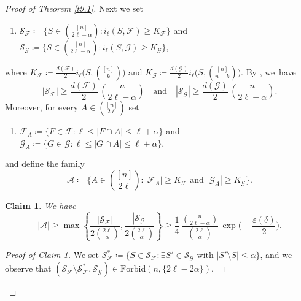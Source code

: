 \documentclass[10pt,a4paper]{amsart}
\newtheorem{claim}[thm]{Claim}
\theoremstyle{remark}
\newcommand{\ee}{\varepsilon}
\newcommand{\meg}{\geqslant}
\newcommand{\mik}{\leqslant}
\newcommand{\Fcal}{\mathcal{F}}
\newcommand{\Gcal}{\mathcal{G}}
\newcommand{\Scal}{\mathcal{S}}
\newcommand{\Acal}{\mathcal{A}}
\begin{document}
\begin{proof}[Proof of Theorem \emph{\ref{t9.1}}]
Next we set
\begin{enumerate}
\item[$\bullet$] $\Scal_{\Fcal} \coloneqq \big\{ S\in\binom{[n]}{2\ell-\alpha}:
i_{\ell}(S,\Fcal)\meg K_{\Fcal}\big\}$ and
$\Scal_{\Gcal}\coloneqq \big\{ S\in\binom{[n]}{2\ell-\alpha}:
i_{\ell}(S,\Gcal)\meg K_{\Gcal}\big\}$,
\end{enumerate}
where $K_{\Fcal}\coloneqq \frac{d(\Fcal)}{2} i_{\ell}\big(S,\binom{[n]}{k}\big)$ and
$K_{\Gcal}\coloneqq \frac{d(\Gcal)}{2}i_{\ell}\big(S,\binom{[n]}{n-k}\big)$.
By \cite[Lemma 4.1]{FR87}, we~have
\begin{equation} \label{e9.7}
|\Scal_{\Fcal}| \meg \frac{d(\Fcal)}{2}\,\binom{n}{2\ell-\alpha}
\ \ \ \text{ and } \ \ \
|\Scal_{\Gcal}| \meg \frac{d(\Gcal)}{2}\, \binom{n}{2\ell-\alpha}.
\end{equation}
Moreover, for every $A\in\binom{[n]}{2\ell}$ set
\begin{enumerate}
\item[$\bullet$] $\Fcal_A\coloneqq \{F\in\Fcal:\ell\mik |F\cap A|\mik \ell+\alpha\}$
and $\Gcal_A\coloneqq \{G\in\Gcal:\ell\mik |G\cap A| \mik \ell+\alpha\}$,
\end{enumerate}
and define the family
\begin{equation} \label{e9.8}
\Acal\coloneqq \bigg\{A\in\binom{[n]}{2\ell}:
|\Fcal_A|\meg K_{\Fcal} \text{ and } |\Gcal_A| \meg K_{\Gcal}\bigg\}.
\end{equation}
\begin{claim} \label{c9.2}
We have
\begin{equation} \label{e9.9}
|\Acal| \meg \max\left\{ \frac{|\Scal_{\Fcal}|}{2\binom{2\ell}{\alpha}},
\frac{|\Scal_{\Gcal}|}{2\binom{2\ell}{\alpha}}\right\} \meg \frac{1}{4}\,
\frac{\binom{n}{2\ell-\alpha}}{\binom{2\ell}{\alpha}}\, \exp\Big(-\frac{\ee(\delta)}{2}\Big).
\end{equation}
\end{claim}
\begin{proof}[Proof of Claim \emph{\ref{c9.2}}]
We set $\Scal^*_{\Fcal}\coloneqq \{S\in\Scal_{\Fcal}:\exists S'\in\Scal_{\Gcal} \text{ with }
|S'\setminus S|\mik \alpha\}$, and we observe that
$(\Scal_{\Fcal}\setminus \Scal^*_{\Fcal},\Scal_{\Gcal})\in\mathrm{Forbid}(n,\{2\ell-2\alpha\})$.

\end{proof}
\end{proof}
\end{document}
